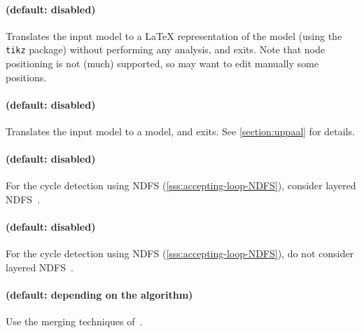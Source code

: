 \paragraph{ (default: disabled)}
Translates the input model to a \LaTeX{} representation of the model (using the \texttt{tikz} package) without performing any analysis, and exits.
Note that node positioning is not (much) supported, so may want to edit manually some positions.

\paragraph{ (default: disabled)}
Translates the input model to a \uppaal{} model, and exits.
See \cref{section:uppaal} for details.



\paragraph{ (default: disabled)}
For the cycle detection using NDFS (\cref{sss:accepting-loop-NDFS}), consider layered NDFS~\cite{NPP18}.

\paragraph{ (default: disabled)}
For the cycle detection using NDFS (\cref{sss:accepting-loop-NDFS}), do not consider layered NDFS~\cite{NPP18}.


\paragraph{ (default: depending on the algorithm)}
Use the merging techniques of~\cite{AFS13atva,AMPP22}.

